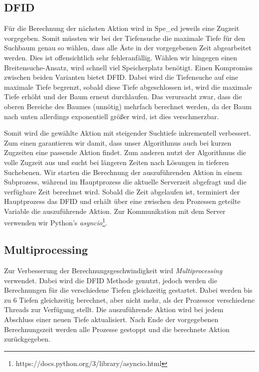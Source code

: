 \subsection{\acrlong{DFID}}

Für die Berechnung der nächsten Aktion wird in Spe\_ed jeweils eine Zugzeit vorgegeben. Somit müssten wir bei der Tiefensuche die maximale Tiefe für den Suchbaum genau so wählen, dass alle Äste in der vorgegebenen Zeit abgearbeitet werden. Dies ist offensichtlich sehr fehleranfällig. Wählen wir hingegen einen Breitensuche-Ansatz, wird schnell viel Speicherplatz benötigt. Einen Kompromiss zwischen beiden Varianten bietet \acrfull{DFID}. Dabei wird die Tiefensuche auf eine maximale Tiefe begrenzt, sobald diese Tiefe abgeschlossen ist, wird die maximale Tiefe erhöht und der Baum erneut durchlaufen. Das verursacht zwar, dass die oberen Bereiche des Baumes (unnötig) mehrfach berechnet werden, da der Baum nach unten allerdings exponentiell größer wird, ist dies verschmerzbar. \cite{Korf.1985}

Somit wird die gewählte Aktion mit steigender Suchtiefe inkrementell verbessert. Zum einen garantieren wir damit, dass unser Algorithmus auch bei kurzen Zugzeiten eine passende Aktion findet. Zum anderen nutzt der Algorithmus die volle Zugzeit aus und sucht bei längeren Zeiten nach Lösungen in tieferen Suchebenen. Wir starten die Berechnung der auszuführenden Aktion in einem Subprozess, während im Hauptprozess die aktuelle Serverzeit abgefragt und die verfügbare Zeit berechnet wird. Sobald die Zeit abgelaufen ist, terminiert der Hauptprozess das \acrshort{DFID} und erhält über eine zwischen den Prozessen geteilte Variable die auszuführende Aktion. Zur Kommunikation mit dem Server verwenden wir Python's \textit{asyncio}\footnote{https://docs.python.org/3/library/asyncio.html}.


\subsection{Multiprocessing}
Zur Verbesserung der Berechnungsgeschwindigkeit wird \textit{Multiprocessing} verwendet. Dabei wird die \acrshort{DFID} Methode genutzt, jedoch werden die Berechnungen für die verschiedene Tiefen gleichzeitig gestartet. Dabei werden bis zu 6 Tiefen gleichzeitig berechnet, aber nicht mehr, als der Prozessor verschiedene Threads zur Verfügung stellt. Die auszuführende Aktion wird bei jedem Abschluss einer neuen Tiefe aktualisiert. Nach Ende der vorgegebenen Berechnungszeit werden alle Prozesse gestoppt und die berechnete Aktion zurückgegeben.

